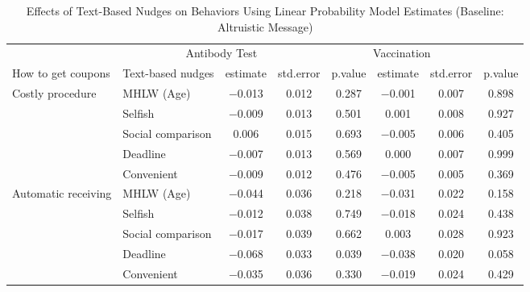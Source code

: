 \begin{table}

\caption{Effects of Text-Based Nudges on Behaviors Using Linear Probability Model Estimates (Baseline: Altruistic Message) \label{tab:act-reg-ftest2}}
\centering
\begin{tabular}[t]{>{\raggedright\arraybackslash}p{5em}lcccccc}
\toprule
\multicolumn{2}{c}{ } & \multicolumn{3}{c}{Antibody Test} & \multicolumn{3}{c}{Vaccination} \\
\cmidrule(l{3pt}r{3pt}){3-5} \cmidrule(l{3pt}r{3pt}){6-8}
How to get coupons & Text-based nudges & estimate & std.error & p.value & estimate  & std.error  & p.value \\
\midrule
Costly procedure & MHLW (Age) & \num{-0.013} & \num{0.012} & \num{0.287} & \num{-0.001} & \num{0.007} & \num{0.898}\\
 & Selfish & \num{-0.009} & \num{0.013} & \num{0.501} & \num{0.001} & \num{0.008} & \num{0.927}\\
 & Social comparison & \num{0.006} & \num{0.015} & \num{0.693} & \num{-0.005} & \num{0.006} & \num{0.405}\\
 & Deadline & \num{-0.007} & \num{0.013} & \num{0.569} & \num{0.000} & \num{0.007} & \num{0.999}\\
 & Convenient & \num{-0.009} & \num{0.012} & \num{0.476} & \num{-0.005} & \num{0.005} & \num{0.369}\\
Automatic receiving & MHLW (Age) & \num{-0.044} & \num{0.036} & \num{0.218} & \num{-0.031} & \num{0.022} & \num{0.158}\\
 & Selfish & \num{-0.012} & \num{0.038} & \num{0.749} & \num{-0.018} & \num{0.024} & \num{0.438}\\
 & Social comparison & \num{-0.017} & \num{0.039} & \num{0.662} & \num{0.003} & \num{0.028} & \num{0.923}\\
 & Deadline & \num{-0.068} & \num{0.033} & \num{0.039} & \num{-0.038} & \num{0.020} & \num{0.058}\\
 & Convenient & \num{-0.035} & \num{0.036} & \num{0.330} & \num{-0.019} & \num{0.024} & \num{0.429}\\
\bottomrule
\end{tabular}
\end{table}
